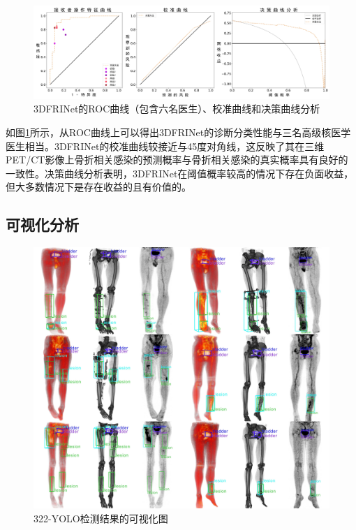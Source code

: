 \begin{figure}[htbp]
  \centering
  \includegraphics[width=\textwidth]{figures/chap04_eval.jpg}
  \caption{3DFRINet的ROC曲线（包含六名医生）、校准曲线和决策曲线分析}
  \label{fig:chap04_eval}
\end{figure}

如图\ref{fig:chap04_eval}所示，从ROC曲线上可以得出3DFRINet的诊断分类性能与三名高级核医学医生相当。3DFRINet的校准曲线较接近与45度对角线，这反映了其在三维PET/CT影像上骨折相关感染的预测概率与骨折相关感染的真实概率具有良好的一致性。决策曲线分析表明，3DFRINet在阈值概率较高的情况下存在负面收益，但大多数情况下是存在收益的且有价值的。

\subsection{可视化分析}
\begin{figure}[htbp]
  \centering
  \includegraphics[width=\textwidth,height=\textheight,keepaspectratio]{figures/chap04_vis.jpg}
  \caption{322-YOLO检测结果的可视化图}
  \label{fig:chap04_vis}
\end{figure}

